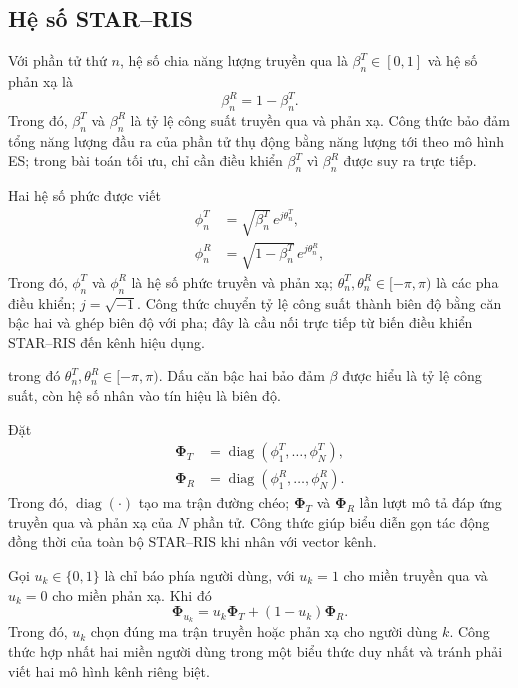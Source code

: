 \subsection{Hệ số STAR--RIS}
Với phần tử thứ $n$, hệ số chia năng lượng truyền qua là $\beta_n^T\in[0,1]$ và hệ số phản xạ là
\begin{equation}
 \beta_n^R=1-\beta_n^T.
 \label{eq:beta-conservation-ch2}
\end{equation}
Trong đó, $\beta_n^T$ và $\beta_n^R$ là tỷ lệ công suất truyền qua và phản xạ. Công thức bảo đảm tổng năng lượng đầu ra của phần tử thụ động bằng năng lượng tới theo mô hình ES; trong bài toán tối ưu, chỉ cần điều khiển $\beta_n^T$ vì $\beta_n^R$ được suy ra trực tiếp.

Hai hệ số phức được viết
\begin{align}
 \phi_n^T&=\sqrt{\beta_n^T}\,e^{j\theta_n^T},\\
 \phi_n^R&=\sqrt{1-\beta_n^T}\,e^{j\theta_n^R},
 \label{eq:star-coefficients}
\end{align}
Trong đó, $\phi_n^T$ và $\phi_n^R$ là hệ số phức truyền và phản xạ; $\theta_n^T,\theta_n^R\in[-\pi,\pi)$ là các pha điều khiển; $j=\sqrt{-1}$. Công thức chuyển tỷ lệ công suất thành biên độ bằng căn bậc hai và ghép biên độ với pha; đây là cầu nối trực tiếp từ biến điều khiển STAR--RIS đến kênh hiệu dụng.

trong đó $\theta_n^T,\theta_n^R\in[-\pi,\pi)$. Dấu căn bậc hai bảo đảm $\beta$ được hiểu là tỷ lệ công suất, còn hệ số nhân vào tín hiệu là biên độ.

Đặt
\begin{align}
 \bm\Phi_T&=\operatorname{diag}(\phi_1^T,\ldots,\phi_N^T),\\
 \bm\Phi_R&=\operatorname{diag}(\phi_1^R,\ldots,\phi_N^R).
\end{align}
Trong đó, $\operatorname{diag}(\cdot)$ tạo ma trận đường chéo; $\bm\Phi_T$ và $\bm\Phi_R$ lần lượt mô tả đáp ứng truyền qua và phản xạ của $N$ phần tử. Công thức giúp biểu diễn gọn tác động đồng thời của toàn bộ STAR--RIS khi nhân với vector kênh.

Gọi $u_k\in\{0,1\}$ là chỉ báo phía người dùng, với $u_k=1$ cho miền truyền qua và $u_k=0$ cho miền phản xạ. Khi đó
\begin{equation}
 \bm\Phi_{u_k}=u_k\bm\Phi_T+(1-u_k)\bm\Phi_R.
\end{equation}
Trong đó, $u_k$ chọn đúng ma trận truyền hoặc phản xạ cho người dùng $k$. Công thức hợp nhất hai miền người dùng trong một biểu thức duy nhất và tránh phải viết hai mô hình kênh riêng biệt.


